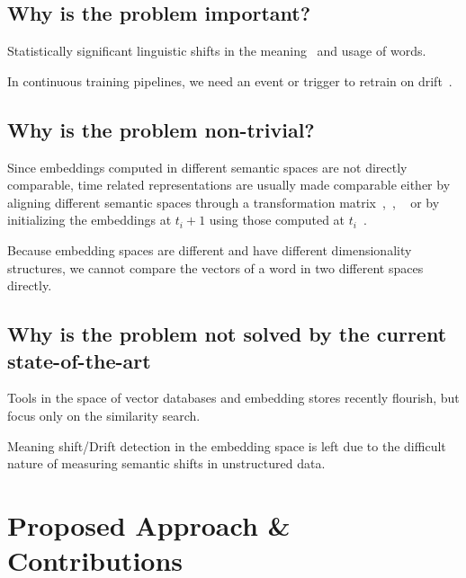 \documentclass{article}
\begin{document}
\subsection{Why is the problem important?}
Statistically significant linguistic shifts in the meaning~\cite{benderClimbingNLUMeaning2020} and usage of words.

In continuous training pipelines, we need an event or trigger to retrain on drift~\cite{baylorContinuousTrainingProduction2019a}.


\subsection{Why is the problem non-trivial?}

Since embeddings computed in different semantic spaces are not directly comparable, time related representations
are usually made comparable either by aligning different semantic spaces through a transformation
matrix~\cite{kulkarniStatisticallySignificantDetection2015},~\cite{azarbonyadWordsAreMalleable2017},
~\cite{hamiltonDiachronicWordEmbeddings2016} or by initializing the embeddings at $t_{i}+1$ using those
computed at $t_{i}$~\cite{}.

Because embedding spaces are different and have different dimensionality structures, we cannot compare the vectors of a
word in two different spaces directly.

\subsection{Why is the problem not solved by the current state-of-the-art}





Tools in the space of vector databases and embedding stores recently flourish, but focus only on the similarity search.

Meaning shift/Drift detection in the embedding space is left due to the difficult nature of measuring semantic shifts in
unstructured data.

\section{Proposed Approach \& Contributions}
\end{document}
